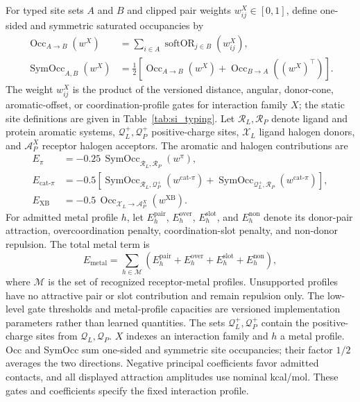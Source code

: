 \documentclass{article}
\begin{document}
For typed site sets \(A\) and \(B\) and clipped pair weights \(w_{ij}^{X}\in[0,1]\), define one-sided and symmetric saturated occupancies by
\begin{align}
    \operatorname{Occ}_{A\rightarrow B}(w^X)
    &=\sum_{i\in A}\operatorname{softOR}_{j\in B}(w_{ij}^{X}),\\
    \operatorname{SymOcc}_{A,B}(w^X)
    &=\frac{1}{2}\left[
      \operatorname{Occ}_{A\rightarrow B}(w^X)
      +\operatorname{Occ}_{B\rightarrow A}((w^X)^\top)
      \right].
    \label{eq:si_typed_occupancy}
\end{align}
The weight \(w_{ij}^{X}\) is the product of the versioned distance, angular, donor-cone, aromatic-offset, or coordination-profile gates for interaction family \(X\); the static site definitions are given in Table~\ref{tab:si_typing}.
Let \(\mathcal R_L,\mathcal R_P\) denote ligand and protein aromatic systems, \(\mathcal Q_L^+,\mathcal Q_P^+\) positive-charge sites, \(\mathcal X_L\) ligand halogen donors, and \(\mathcal A_P^{X}\) receptor halogen acceptors.
The aromatic and halogen contributions are
\begin{align}
    E_{\pi}
    &=-0.25\,\operatorname{SymOcc}_{\mathcal R_L,\mathcal R_P}(w^{\pi}),\\
    E_{\mathrm{cat}\text{-}\pi}
    &=-0.5\left[
      \operatorname{SymOcc}_{\mathcal R_L,\mathcal Q_P^+}(w^{\mathrm{cat}\text{-}\pi})
      +\operatorname{SymOcc}_{\mathcal Q_L^+,\mathcal R_P}(w^{\mathrm{cat}\text{-}\pi})
      \right],\\
    E_{\mathrm{XB}}
    &=-0.5\,\operatorname{Occ}_{\mathcal X_L\rightarrow\mathcal A_P^{X}}
      (w^{\mathrm{XB}}).
    \label{eq:si_aromatic_halogen_energy}
\end{align}
For admitted metal profile \(h\), let \(E_h^{\mathrm{pair}}\), \(E_h^{\mathrm{over}}\), \(E_h^{\mathrm{slot}}\), and \(E_h^{\mathrm{non}}\) denote its donor-pair attraction, overcoordination penalty, coordination-slot penalty, and non-donor repulsion.  The total metal term is
\begin{equation}
    E_{\mathrm{metal}}
    =\sum_{h\in\mathcal M}
      \left(E_h^{\mathrm{pair}}+E_h^{\mathrm{over}}
      +E_h^{\mathrm{slot}}+E_h^{\mathrm{non}}\right),
    \label{eq:si_metal_energy}
\end{equation}
where \(\mathcal M\) is the set of recognized receptor-metal profiles.
Unsupported profiles have no attractive pair or slot contribution and remain repulsion only.
The low-level gate thresholds and metal-profile capacities are versioned implementation parameters rather than learned quantities.
The sets \(\mathcal Q_L^+,\mathcal Q_P^+\) contain the positive-charge sites from \(\mathcal Q_L,\mathcal Q_P\). \(X\) indexes an interaction family and \(h\) a metal profile. Occ and SymOcc sum one-sided and symmetric site occupancies; their factor \(1/2\) averages the two directions. Negative principal coefficients favor admitted contacts, and all displayed attraction amplitudes use nominal kcal/mol. These gates and coefficients specify the fixed interaction profile.
\end{document}
